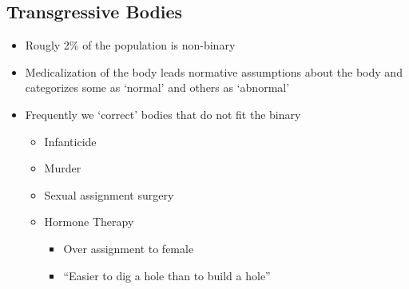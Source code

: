 \documentclass[a4paper]{article}
\begin{document}
\subsection{Transgressive Bodies}
\begin{itemize}
  \item Rougly 2\% of the population is non-binary
  \item Medicalization of the body leads normative assumptions about the body and categorizes some as `normal' and others as `abnormal'
  \item Frequently we `correct' bodies that do not fit the binary \begin{itemize}
    \item Infanticide
    \item Murder
    \item Sexual assignment surgery
    \item Hormone Therapy \begin{itemize}
      \item Over assignment to female
      \item ``Easier to dig a hole than to build a hole''
    \end{itemize}
  \end{itemize}
\end{itemize}
\end{document}
